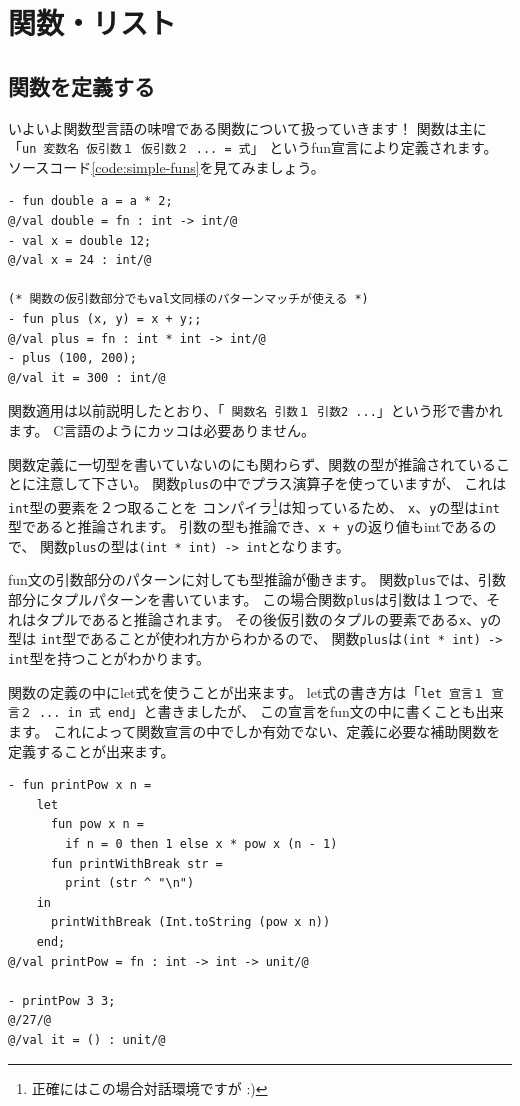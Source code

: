 \documentclass[11pt,a4paper]{article}
\begin{document}
\section{関数・リスト}
\subsection{関数を定義する}
いよいよ関数型言語の味噌である関数について扱っていきます！
関数は主に「\lstinline{un 変数名 仮引数１ 仮引数２ ... = 式}」
というfun宣言により定義されます。
ソースコード\ref{code:simple-funs}を見てみましょう。

\begin{lstlisting}[caption={単純な関数の定義},label={code:simple-funs}]
- fun double a = a * 2;
@/val double = fn : int -> int/@
- val x = double 12;
@/val x = 24 : int/@

(* 関数の仮引数部分でもval文同様のパターンマッチが使える *)
- fun plus (x, y) = x + y;;
@/val plus = fn : int * int -> int/@
- plus (100, 200);
@/val it = 300 : int/@
\end{lstlisting}

関数適用は以前説明したとおり、「\lstinline{ 関数名 引数１ 引数2 ...}」という形で書かれます。
C言語のようにカッコは必要ありません。

関数定義に一切型を書いていないのにも関わらず、関数の型が推論されていることに注意して下さい。
関数\lstinline{plus}の中でプラス演算子を使っていますが、
これは\lstinline{int}型の要素を２つ取ることを
コンパイラ\footnote{正確にはこの場合対話環境ですが :)}は知っているため、
\lstinline{x}、\lstinline{y}の型は\lstinline{int}型であると推論されます。
引数の型も推論でき、\lstinline{x + y}の返り値もintであるので、
関数\lstinline{plus}の型は\lstinline{(int * int) -> int}となります。

fun文の引数部分のパターンに対しても型推論が働きます。
関数\lstinline{plus}では、引数部分にタプルパターンを書いています。
この場合関数\lstinline{plus}は引数は１つで、それはタプルであると推論されます。
その後仮引数のタプルの要素である\lstinline{x}、\lstinline{y}の型は
\lstinline{int}型であることが使われ方からわかるので、
関数\lstinline{plus}は\lstinline{(int * int) -> int}型を持つことがわかります。

関数の定義の中にlet式を使うことが出来ます。
let式の書き方は「\lstinline{let 宣言１ 宣言２ ... in 式 end}」と書きましたが、
この宣言をfun文の中に書くことも出来ます。
これによって関数宣言の中でしか有効でない、定義に必要な補助関数を定義することが出来ます。

\begin{lstlisting}[caption=ネストした関数宣言,label=code:nested-fun]
- fun printPow x n =
    let
      fun pow x n =
        if n = 0 then 1 else x * pow x (n - 1)
      fun printWithBreak str =
        print (str ^ "\n")
    in
      printWithBreak (Int.toString (pow x n))
    end;
@/val printPow = fn : int -> int -> unit/@

- printPow 3 3;
@/27/@
@/val it = () : unit/@
\end{lstlisting}
\end{document}
